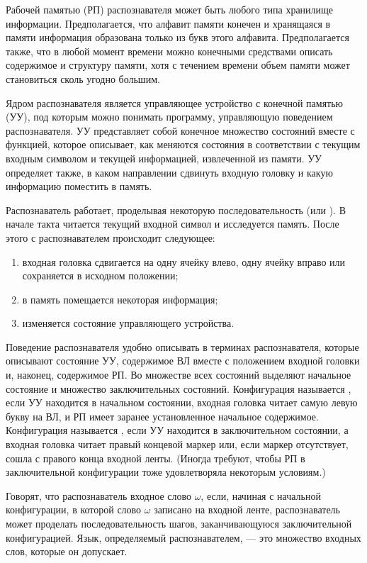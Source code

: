 Рабочей памятью (РП) распознавателя может быть любого типа хранилище
информации. Предполагается, что алфавит памяти конечен и хранящаяся в
памяти информация образована только из букв этого алфавита.
Предполагается также, что в любой момент времени можно конечными
средствами описать содержимое и структуру памяти, хотя с течением
времени объем памяти может становиться сколь угодно большим.

Ядром распознавателя является управляющее устройство с конечной памятью
(УУ), под которым можно понимать программу, управляющую поведением
распознавателя. УУ представляет собой конечное множество состояний
вместе с функцией, которое описывает, как меняются состояния в
соответствии с текущим входным символом и текущей информацией,
извлеченной из памяти. УУ определяет также, в каком направлении
сдвинуть входную головку и какую информацию поместить в память.

Распознаватель работает, проделывая некоторую последовательность
 (или ). В начале такта читается
текущий входной символ и исследуется память. После этого с
распознавателем происходит следующее:
\begin{enumerate}
    \item входная головка сдвигается на одну ячейку влево, одну ячейку вправо
или сохраняется в исходном положении;

    \item в память помещается некоторая информация;

    \item изменяется состояние управляющего устройства.
\end{enumerate}

Поведение распознавателя удобно описывать в терминах
распознавателя, которые описывают состояние УУ, содержимое ВЛ
вместе с положением входной головки и, наконец, содержимое
РП. Во множестве всех состояний выделяют начальное состояние
и множество заключительных
состояний. Конфигурация называется ,
если УУ находится в начальном состоянии, входная головка
читает самую левую
букву на ВЛ, и РП имеет заранее установленное начальное
содержимое. Конфигурация называется , если УУ находится в
заключительном состоянии, а входная головка читает правый концевой
маркер или, если маркер отсутствует, сошла с правого конца входной
ленты. (Иногда требуют, чтобы РП в заключительной конфигурации тоже
удовлетворяла некоторым условиям.)

Говорят, что распознаватель  входное слово $\omega$,
если, начиная с начальной конфигурации, в которой слово $\omega$
записано на входной ленте, распознаватель может проделать
последовательность шагов, заканчивающуюся заключительной
конфигурацией. Язык, определяемый распознавателем, --- это множество
входных слов, которые он допускает.

